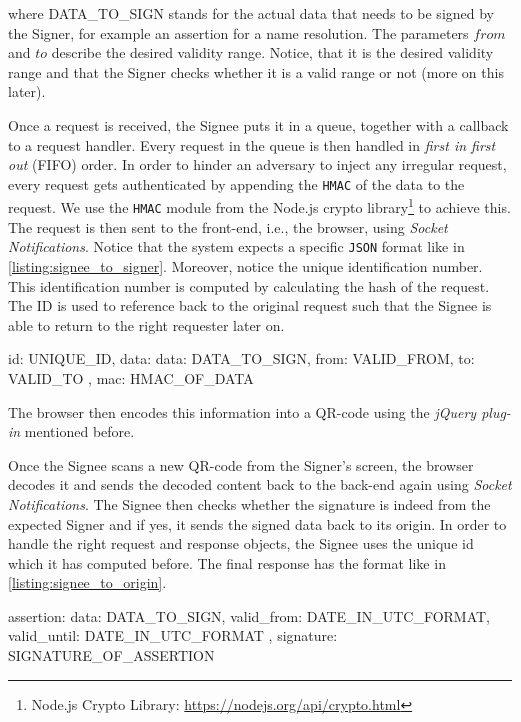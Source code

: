 where DATA\_TO\_SIGN stands for the actual data that needs to be signed by the Signer, for example an assertion for a name resolution. The parameters $from$ and $to$ describe the desired validity range. Notice, that it is the desired validity range and that the Signer checks whether it is a valid range or not (more on this later).

Once a request is received, the Signee puts it in a queue, together with a callback to a request handler. Every request in the queue is then handled in \emph{first in first out} (FIFO) order. In order to hinder an adversary to inject any irregular request, every request gets authenticated by appending the \texttt{HMAC} of the data to the request. We use the \texttt{HMAC} module from the Node.js crypto library\footnote{Node.js Crypto Library: \url{https://nodejs.org/api/crypto.html}} to achieve this. The request is then sent to the front-end, i.e., the browser, using \emph{Socket Notifications}. Notice that the system expects a specific \texttt{JSON} format like in \autoref{listing:signee_to_signer}. Moreover, notice the unique identification number. This identification number is computed by calculating the hash of the request. The ID is used to reference back to the original request such that the Signee is able to return to the right requester later on.

\begin{code}[caption={Expected message format from the Signee to the Signer}, label={listing:signee_to_signer}]
{
    id: UNIQUE_ID,
    data: { data: DATA_TO_SIGN,
            from: VALID_FROM,
            to: VALID_TO },
    mac: HMAC_OF_DATA
}
\end{code}

The browser then encodes this information into a QR-code using the \emph{jQuery plug-in} mentioned before.

Once the Signee scans a new QR-code from the Signer's screen, the browser decodes it and sends the decoded content back to the back-end again using \emph{Socket Notifications}. The Signee then checks whether the signature is indeed from the expected Signer and if yes, it sends the signed data back to its origin. In order to handle the right request and response objects, the Signee uses the unique id which it has computed before. The final response has the format like in \autoref{listing:signee_to_origin}.

\begin{code}[caption={Expected message format from the Signee back to the origin}, label={listing:signee_to_origin}]
{
    assertion: { data: DATA_TO_SIGN,
                 valid_from: DATE_IN_UTC_FORMAT,
                 valid_until: DATE_IN_UTC_FORMAT },
    signature: SIGNATURE_OF_ASSERTION
}
\end{code}

